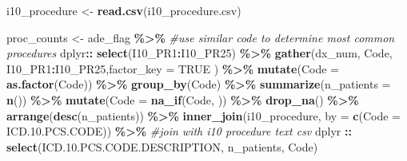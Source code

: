 \documentclass[preprint, 3p,
authoryear]{elsarticle} %
\newenvironment{Shaded}{\begin{snugshade}}{\end{snugshade}}
\newcommand{\CommentTok}[1]{\textcolor[rgb]{0.56,0.35,0.01}{\textit{#1}}}
\newcommand{\DataTypeTok}[1]{\textcolor[rgb]{0.13,0.29,0.53}{#1}}
\newcommand{\FloatTok}[1]{\textcolor[rgb]{0.00,0.00,0.81}{#1}}
\newcommand{\KeywordTok}[1]{\textcolor[rgb]{0.13,0.29,0.53}{\textbf{#1}}}
\newcommand{\NormalTok}[1]{#1}
\newcommand{\OperatorTok}[1]{\textcolor[rgb]{0.81,0.36,0.00}{\textbf{#1}}}
\newcommand{\OtherTok}[1]{\textcolor[rgb]{0.56,0.35,0.01}{#1}}
\newcommand{\StringTok}[1]{\textcolor[rgb]{0.31,0.60,0.02}{#1}}
\begin{document}
\begin{Shaded}
\begin{Highlighting}[]
\NormalTok{i10\_procedure \textless{}{-}}\StringTok{ }\KeywordTok{read.csv}\NormalTok{(}\StringTok{\textquotesingle{}i10\_procedure.csv\textquotesingle{}}\NormalTok{)}


\NormalTok{proc\_counts \textless{}{-}}\StringTok{ }\NormalTok{ade\_flag }\OperatorTok{\%\textgreater{}\%}\StringTok{ }\CommentTok{\#use similar code to determine most common procedures}
\StringTok{  }\NormalTok{dplyr}\OperatorTok{::}\StringTok{ }\KeywordTok{select}\NormalTok{(I10\_PR1}\OperatorTok{:}\NormalTok{I10\_PR25) }\OperatorTok{\%\textgreater{}\%}
\StringTok{  }\KeywordTok{gather}\NormalTok{(dx\_num, Code, I10\_PR1}\OperatorTok{:}\NormalTok{I10\_PR25,}\DataTypeTok{factor\_key =} \OtherTok{TRUE}\NormalTok{ ) }\OperatorTok{\%\textgreater{}\%}
\StringTok{  }\KeywordTok{mutate}\NormalTok{(}\DataTypeTok{Code =} \KeywordTok{as.factor}\NormalTok{(Code)) }\OperatorTok{\%\textgreater{}\%}
\StringTok{  }\KeywordTok{group\_by}\NormalTok{(Code) }\OperatorTok{\%\textgreater{}\%}
\StringTok{  }\KeywordTok{summarize}\NormalTok{(}\DataTypeTok{n\_patients =} \KeywordTok{n}\NormalTok{()) }\OperatorTok{\%\textgreater{}\%}
\StringTok{  }\KeywordTok{mutate}\NormalTok{(}\DataTypeTok{Code =} \KeywordTok{na\_if}\NormalTok{(Code, }\StringTok{\textquotesingle{} \textquotesingle{}}\NormalTok{)) }\OperatorTok{\%\textgreater{}\%}
\StringTok{  }\KeywordTok{drop\_na}\NormalTok{() }\OperatorTok{\%\textgreater{}\%}
\StringTok{  }\KeywordTok{arrange}\NormalTok{(}\KeywordTok{desc}\NormalTok{(n\_patients)) }\OperatorTok{\%\textgreater{}\%}
\StringTok{  }\KeywordTok{inner\_join}\NormalTok{(i10\_procedure, }\DataTypeTok{by =} \KeywordTok{c}\NormalTok{(}\StringTok{\textquotesingle{}Code\textquotesingle{}}\NormalTok{ =}\StringTok{ \textquotesingle{}ICD.10.PCS.CODE\textquotesingle{}}\NormalTok{))  }\OperatorTok{\%\textgreater{}\%}\StringTok{ }\CommentTok{\#join with i10 procedure text csv}
\StringTok{  }\NormalTok{dplyr }\OperatorTok{::}\StringTok{ }\KeywordTok{select}\NormalTok{(ICD.}\FloatTok{10.}\NormalTok{PCS.CODE.DESCRIPTION, n\_patients, Code)}



\end{Highlighting}
\end{Shaded}
\end{document}
